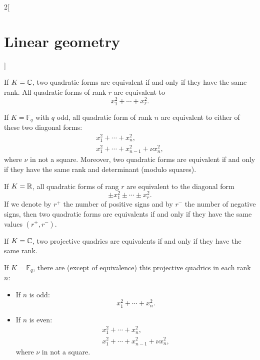 \documentclass[../../../main.tex]{subfiles}
\begin{document}
\begin{multicols}{2}[\section{Linear geometry}]
\begin{prop}
  \end{prop}
  \begin{theorem}
    If $K=\mathbb{C} $, two quadratic forms are equivalent if and only if they have the same rank. All quadratic forms of rank $r$ are equivalent to $$x_1^2+\cdots+x_r^2.$$
  \end{theorem}
  \begin{theorem}
    If $K=\mathbb{F}_q$ with $q$ odd, all quadratic form
    of rank $n$ are equivalent to either of these two diagonal forms:
    \begin{gather*}
      x_1^2+\cdots+ x_n^2,\\
      x_1^2+\cdots+ x_{n-1}^2+\nu x_n^2,
    \end{gather*}
    where $\nu$ in not a square. Moreover, two quadratic forms are equivalent if and only if they have the same rank and determinant (modulo squares).
  \end{theorem}
  \begin{theorem}
    If $K=\mathbb{R} $, all quadratic forms
    of rang $r$ are equivalent to the diagonal form
    $$\pm x_1^2\pm\cdots\pm x_r^2.$$ If we denote by $r^+$ the number of positive signs and by $r^-$ the number of negative signs, then two quadratic forms are equivalents if and only if they have the same values $(r^+,r^-)$.
  \end{theorem}
  \begin{theorem}
    If $K=\mathbb{C} $, two projective quadrics are equivalents if and only if they have the same rank.
  \end{theorem}
  \begin{theorem}
    If $K=\mathbb{F}_q$, there are (except of equivalence) this projective quadrics in each rank $n$:
    \begin{itemize}
      \item If $n$ is odd: $$\displaystyle x_1^2+\cdots+ x_n^2.$$
      \item If $n$ is even: \begin{gather*}
              x_1^2+\cdots+ x_n^2,\\
              x_1^2+\cdots+ x_{n-1}^2+\nu x_n^2,
            \end{gather*}
            where $\nu$ in not a square.
    \end{itemize}
  \end{theorem}

\end{multicols}
\end{document}
